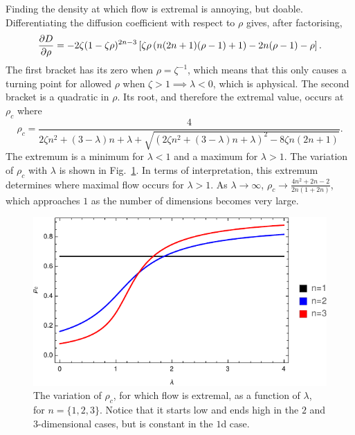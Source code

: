 Finding the density at which flow is extremal is annoying, but doable. Differentiating the diffusion
coefficient with respect to $\rho$ gives, after factorising,
\begin{equation}
 \frac{\partial D}{\partial \rho} = -2 \zeta (1-\zeta \rho )^{2 n-3} \left[ \zeta \rho  \left(n (2 n+1) (\rho-1)+1\right)-2 n (\rho-1)-\rho \right].
\end{equation}
The first bracket has its zero when $\rho=\zeta^{-1}$, which means that this only causes a turning point
for allowed $\rho$ when $\zeta>1 \implies \lambda<0$, which is aphysical. The second bracket is a quadratic in $\rho$. Its root, and therefore the extremal value, occurs at $\rho_c$ where
\begin{equation} \label{eq:critRho}
 \rho_c = \frac{4}{2 \zeta n^2+(3-\lambda) n+\lambda + \sqrt{\left(2 \zeta n^2+(3-\lambda) n+\lambda\right)^2-8 \zeta n (2 n+1)}}.
\end{equation}
The extremum is a minimum for $\lambda<1$ and a maximum for $\lambda>1$. The variation of $\rho_c$
with $\lambda$ is shown in Fig.~\ref{fig:criticalRho}. In terms of interpretation, this extremum determines where maximal flow occurs for $\lambda>1$. As $\lambda \rightarrow \infty$, 
$\rho_c \rightarrow \frac{4n^2+2n-2}{2n(1+2n)}$, which approaches $1$ as the number of dimensions
becomes very large. 
 \begin{figure}[h!]
 \caption[The variation of the density of maximal/minimal flow with $\lambda$.]{\label{fig:criticalRho} 
 The variation of $\rho_c$, for which flow is extremal, as a function of $\lambda$, for $n=\{1, 2, 3\}$. Notice that it starts low and ends high in the $2$ and $3$-dimensional cases, but is constant in
 the $1$d case.
 }
  \begin{center}
 \includegraphics[width=0.66\linewidth]{analytics/images/nDCriticalRho}
  \end{center}
\end{figure}

